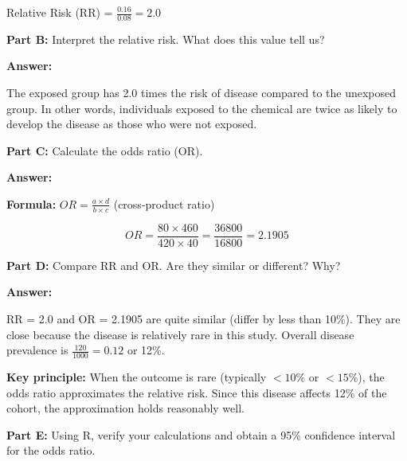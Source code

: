 \documentclass[11pt]{article}
\begin{document}
\vspace{0.3cm}

Relative Risk (RR) = $\frac{0.16}{0.08} = 2.0$

\vspace{0.5cm}

\textbf{Part B:} Interpret the relative risk. What does this value tell us?

\vspace{0.3cm}

\textbf{Answer:}

The exposed group has 2.0 times the risk of disease compared to the unexposed group. In other words, individuals exposed to the chemical are twice as likely to develop the disease as those who were not exposed.

\vspace{0.5cm}

\textbf{Part C:} Calculate the odds ratio (OR).

\vspace{0.3cm}

\textbf{Answer:}

\textbf{Formula:} $OR = \frac{a \times d}{b \times c}$ (cross-product ratio)

\vspace{0.3cm}

$$OR = \frac{80 \times 460}{420 \times 40} = \frac{36800}{16800} = 2.1905$$

\vspace{0.5cm}

\textbf{Part D:} Compare RR and OR. Are they similar or different? Why?

\vspace{0.3cm}

\textbf{Answer:}

RR = 2.0 and OR = 2.1905 are quite similar (differ by less than 10\%). They are close because the disease is relatively rare in this study. Overall disease prevalence is $\frac{120}{1000} = 0.12$ or 12\%.

\vspace{0.3cm}

\textbf{Key principle:} When the outcome is rare (typically $< 10\%$ or $< 15\%$), the odds ratio approximates the relative risk. Since this disease affects 12\% of the cohort, the approximation holds reasonably well.

\vspace{0.5cm}

\textbf{Part E:} Using R, verify your calculations and obtain a 95\% confidence interval for the odds ratio.
\end{document}
